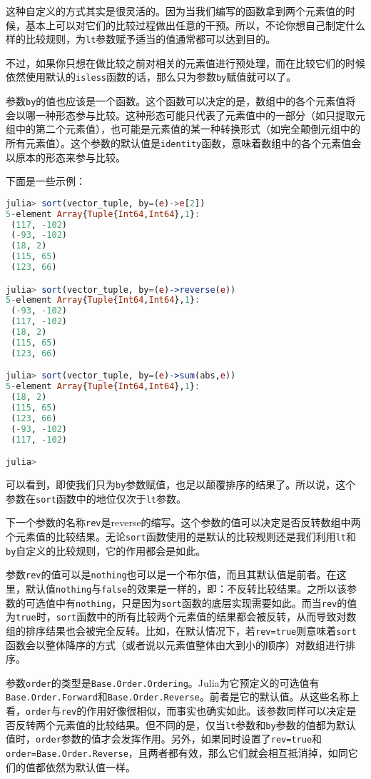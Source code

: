 这种自定义的方式其实是很灵活的。因为当我们编写的函数拿到两个元素值的时候，基本上可以对它们的比较过程做出任意的干预。所以，不论你想自己制定什么样的比较规则，为\verb`lt`参数赋予适当的值通常都可以达到目的。

不过，如果你只想在做比较之前对相关的元素值进行预处理，而在比较它们的时候依然使用默认的\verb`isless`函数的话，那么只为参数\verb`by`赋值就可以了。

参数\verb`by`的值也应该是一个函数。这个函数可以决定的是，数组中的各个元素值将会以哪一种形态参与比较。这种形态可能只代表了元素值中的一部分（如只提取元组中的第二个元素值），也可能是元素值的某一种转换形式（如完全颠倒元组中的所有元素值）。这个参数的默认值是\verb`identity`函数，意味着数组中的各个元素值会以原本的形态来参与比较。

下面是一些示例：

\begin{lstlisting}[language=julia]
julia> sort(vector_tuple, by=(e)->e[2])
5-element Array{Tuple{Int64,Int64},1}:
 (117, -102)
 (-93, -102)
 (18, 2)    
 (115, 65)  
 (123, 66)  

julia> sort(vector_tuple, by=(e)->reverse(e))
5-element Array{Tuple{Int64,Int64},1}:
 (-93, -102)
 (117, -102)
 (18, 2)    
 (115, 65)  
 (123, 66)  

julia> sort(vector_tuple, by=(e)->sum(abs,e))
5-element Array{Tuple{Int64,Int64},1}:
 (18, 2)    
 (115, 65)  
 (123, 66)  
 (-93, -102)
 (117, -102)

julia> 
\end{lstlisting}

可以看到，即使我们只为\verb`by`参数赋值，也足以颠覆排序的结果了。所以说，这个参数在\verb`sort`函数中的地位仅次于\verb`lt`参数。

下一个参数的名称\verb`rev`是reverse的缩写。这个参数的值可以决定是否反转数组中两个元素值的比较结果。无论\verb`sort`函数使用的是默认的比较规则还是我们利用\verb`lt`和\verb`by`自定义的比较规则，它的作用都会是如此。

参数\verb`rev`的值可以是\verb`nothing`也可以是一个布尔值，而且其默认值是前者。在这里，默认值\verb`nothing`与\verb`false`的效果是一样的，即：不反转比较结果。之所以该参数的可选值中有\verb`nothing`，只是因为\verb`sort`函数的底层实现需要如此。而当\verb`rev`的值为\verb`true`时，\verb`sort`函数中的所有比较两个元素值的结果都会被反转，从而导致对数组的排序结果也会被完全反转。比如，在默认情况下，若\verb`rev=true`则意味着\verb`sort`函数会以整体降序的方式（或者说以元素值整体由大到小的顺序）对数组进行排序。

参数\verb`order`的类型是\verb`Base.Order.Ordering`。Julia为它预定义的可选值有\verb`Base.Order.Forward`和\verb`Base.Order.Reverse`。前者是它的默认值。从这些名称上看，\verb`order`与\verb`rev`的作用好像很相似，而事实也确实如此。该参数同样可以决定是否反转两个元素值的比较结果。但不同的是，仅当\verb`lt`参数和\verb`by`参数的值都为默认值时，\verb`order`参数的值才会发挥作用。另外，如果同时设置了\verb`rev=true`和\verb`order=Base.Order.Reverse`，且两者都有效，那么它们就会相互抵消掉，如同它们的值都依然为默认值一样。

